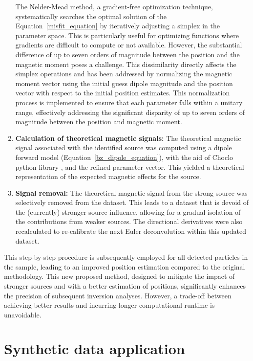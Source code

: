 \begin{enumerate}
{     The Nelder-Mead method, a gradient-free optimization technique, systematically searches the optimal solution of the Equation~\ref{misfit_equation} by iteratively adjusting a simplex in the parameter space. This is particularly useful for optimizing functions where gradients are difficult to compute or not available. However, the substantial difference of up to seven orders of magnitude between the position and the magnetic moment poses a challenge. This dissimilarity directly affects the simplex operations and has been addressed by normalizing the magnetic moment vector using the initial guess dipole magnitude and the position vector with respect to the initial position estimates. This normalization process is implemented to ensure that each parameter falls within a unitary range, effectively addressing the significant disparity of up to seven orders of magnitude between the position and magnetic moment.
     }
    
    \item \textbf{Calculation of theoretical magnetic signals:} The theoretical magnetic signal associated with the identified source was computed using a dipole forward model (Equation~\ref{bz_dipole_equation}), with the aid of Choclo python library \citep{choclo2022}, and the refined parameter vector. This yielded a theoretical representation of the expected magnetic effects for the source.
    
    \item \textbf{Signal removal:} The theoretical magnetic signal from the strong source was selectively removed from the dataset. This leads to a dataset that is devoid of the (currently) stronger source influence, allowing for a gradual isolation of the contributions from weaker sources. The directional derivatives were also recalculated to re-calibrate the next Euler deconvolution within this updated dataset.
 
\end{enumerate}

This step-by-step procedure is subsequently employed for all detected particles in the sample, leading to an improved position estimation compared to the original methodology. This new proposed method, designed to mitigate the impact of stronger sources and with a better estimation of positions, significantly enhances the precision of subsequent inversion analyses. However, a trade-off between achieving better results and incurring longer computational runtime is unavoidable. 


\section{Synthetic data application}

